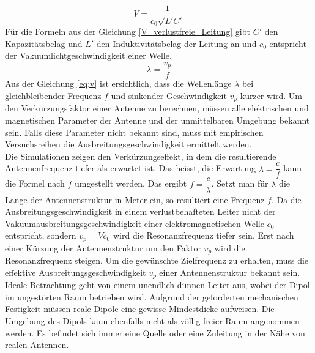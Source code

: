 \begin{equation}\label{V_verlustfreie_Leitung}
V=\dfrac{1}{c_0 \sqrt{L'C'}} 
\end{equation}
Für die Formeln aus der Gleichung \ref{V_verlustfreie_Leitung} gibt $C'$  den Kapazitätsbelag und $L'$ den Induktivitätsbelag  der Leitung an und $c_0$ entspricht der Vakuumlichtgeschwindigkeit einer Welle.
\begin{equation}\label{eq:v}
\lambda=\dfrac{v_p}{f}
\end{equation}  
Aus der Gleichung \ref{eq:v}  ist ersichtlich, dass die Wellenlänge $\lambda$ bei gleichbleibender Frequenz $f$ und sinkender Geschwindigkeit $v_p$ kürzer wird. 
Um den Verkürzungsfaktor einer Antenne zu berechnen, müssen alle elektrischen und magnetischen Parameter der Antenne und der unmittelbaren Umgebung bekannt sein. Falls diese Parameter  nicht bekannt sind, muss mit empirischen Versuchsreihen die Ausbreitungsgeschwindigkeit ermittelt werden.\\

Die Simulationen zeigen den Verkürzungseffekt, in dem die resultierende Antennenfrequenz tiefer als erwartet ist. Das heisst, die Erwartung $\lambda = \dfrac{c}{f}$ kann die Formel nach $f$ umgestellt werden. Das ergibt $f=\dfrac{c}{\lambda}$. Setzt man für $\lambda$ die Länge der Antennenstruktur in Meter ein, so resultiert eine Frequenz $f$. Da die Ausbreitungsgeschwindigkeit in einem verlustbehafteten Leiter nicht der Vakuumausbreitungsgeschwindigkeit einer elektromagnetischen Welle $c_0$ entspricht, sondern $v_p=V c_0$ wird die Resonanzfrequenz tiefer sein. Erst nach einer Kürzung der Antennenstruktur um den Faktor $v_p$ wird die Resonanzfrequenz steigen. Um die gewünschte Zielfrequenz zu erhalten, muss die effektive Ausbreitungsgeschwindigkeit $v_p$ einer Antennenstruktur bekannt sein.\\

Ideale Betrachtung geht von einem unendlich dünnen Leiter aus, wobei der Dipol im ungestörten Raum betrieben wird. Aufgrund der geforderten mechanischen Festigkeit müssen reale Dipole eine gewisse Mindestdicke aufweisen. Die Umgebung des Dipols kann ebenfalls nicht als völlig freier Raum angenommen werden. Es befindet sich immer eine Quelle oder eine Zuleitung in der Nähe von realen Antennen. \\

